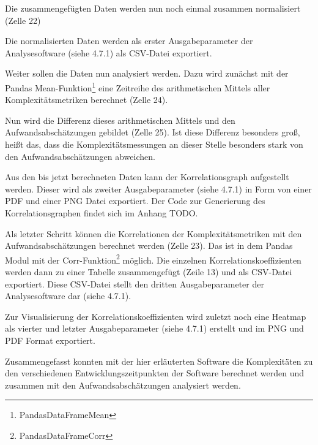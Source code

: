 \lstset{style=pythonStyle}


Die zusammengefügten Daten werden nun noch einmal zusammen normalisiert
(Zelle 22)

\lstset{style=pythonStyle}


Die normalisierten Daten werden als erster Ausgabeparameter der
Analysesoftware (siehe 4.7.1) als CSV-Datei exportiert.

Weiter sollen die Daten nun analysiert werden. Dazu wird zunächst mit
der Pandas Mean-Funktion\footnote{PandasDataFrameMean} eine Zeitreihe
des arithmetischen Mittels aller Komplexitätsmetriken berechnet (Zelle
24).

\lstset{style=pythonStyle}


Nun wird die Differenz dieses arithmetischen Mittels und den
Aufwandsabschätzungen gebildet (Zelle 25). Ist diese Differenz besonders
groß, heißt das, dass die Komplexitätsmessungen an dieser Stelle
besonders stark von den Aufwandsabschätzungen abweichen.

\lstset{style=pythonStyle}


Aus den bis jetzt berechneten Daten kann der Korrelationsgraph
aufgestellt werden. Dieser wird als zweiter Ausgabeparameter (siehe 4.7.1) in Form von einer
PDF und einer PNG Datei exportiert. Der Code zur Generierung des Korrelationsgraphen findet sich im Anhang TODO.

Als letzter Schritt können die Korrelationen der Komplexitätsmetriken
mit den Aufwandsabschätzungen berechnet werden (Zelle 23). Das ist in
dem Pandas Modul mit der Corr-Funktion\footnote{PandasDataFrameCorr}
möglich. Die einzelnen Korrelationskoeffizienten werden dann zu einer
Tabelle zusammengefügt (Zeile 13) und als CSV-Datei exportiert. Diese
CSV-Datei stellt den dritten Ausgabeparameter der Analysesoftware dar
(siehe 4.7.1).

Zur Visualisierung der Korrelationskoeffizienten wird zuletzt noch eine
Heatmap als vierter und letzter Ausgabeparameter (siehe 4.7.1) erstellt
und im PNG und PDF Format exportiert.

Zusammengefasst konnten mit der hier erläuterten Software die
Komplexitäten zu den verschiedenen Entwicklungszeitpunkten der Software
berechnet werden und zusammen mit den Aufwandsabschätzungen analysiert
werden.

